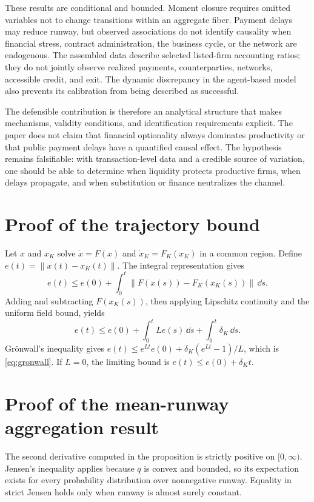 \documentclass[11pt,a4paper]{article}
\begin{document}
These results are conditional and bounded. Moment closure requires omitted variables not to change transitions within an aggregate fiber. Payment delays may reduce runway, but observed associations do not identify causality when financial stress, contract administration, the business cycle, or the network are endogenous. The assembled data describe selected listed-firm accounting ratios; they do not jointly observe realized payments, counterparties, networks, accessible credit, and exit. The dynamic discrepancy in the agent-based model also prevents its calibration from being described as successful.

The defensible contribution is therefore an analytical structure that makes mechanisms, validity conditions, and identification requirements explicit. The paper does not claim that financial optionality always dominates productivity or that public payment delays have a quantified causal effect. The hypothesis remains falsifiable: with transaction-level data and a credible source of variation, one should be able to determine when liquidity protects productive firms, when delays propagate, and when substitution or finance neutralizes the channel.

\appendix
\section{Proof of the trajectory bound}
Let $x$ and $x_K$ solve $\dot x=F(x)$ and $\dot x_K=F_K(x_K)$ in a common region. Define $e(t)=\|x(t)-x_K(t)\|$. The integral representation gives
\[
e(t)\leq e(0)+\int_0^t\|F(x(s))-F_K(x_K(s))\|\,\dd s.
\]
Adding and subtracting $F(x_K(s))$, then applying Lipschitz continuity and the uniform field bound, yields
\[
e(t)\leq e(0)+\int_0^t Le(s)\,\dd s+\int_0^t\delta_K\,\dd s.
\]
Grönwall’s inequality gives $e(t)\leq e^{Lt}e(0)+\delta_K(e^{Lt}-1)/L$, which is \eqref{eq:gronwall}. If $L=0$, the limiting bound is $e(t)\leq e(0)+\delta_Kt$.

\section{Proof of the mean-runway aggregation result}
The second derivative computed in the proposition is strictly positive on $[0,\infty)$. Jensen's inequality applies because $q$ is convex and bounded, so its expectation exists for every probability distribution over nonnegative runway. Equality in strict Jensen holds only when runway is almost surely constant.
\end{document}
